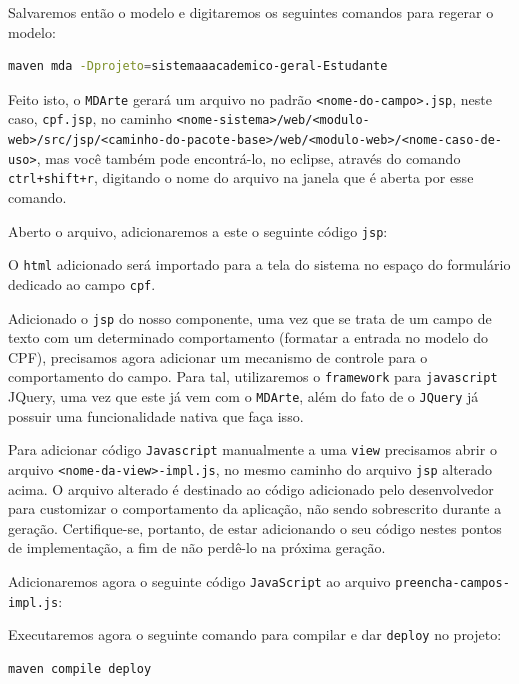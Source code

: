 Salvaremos então o modelo e digitaremos os seguintes comandos para regerar o
modelo:

\begin{lstlisting}[language=bash, frame=single, breaklines=true]
maven mda -Dprojeto=sistemaaacademico-geral-Estudante
\end{lstlisting}

Feito isto, o \texttt{MDArte} gerará um arquivo no padrão
\texttt{<nome-do-campo>.jsp}, neste caso, \texttt{cpf.jsp}, no caminho
\texttt{<nome-sistema>/web/<modulo-web>/src/jsp/<caminho-do-pacote-base>/web/<modulo-web>/<nome-caso-de-uso>},
mas você também pode encontrá-lo, no eclipse, através do comando
\texttt{ctrl+shift+r}, digitando o nome do arquivo na janela que é aberta por
esse comando.

Aberto o arquivo, adicionaremos a este o seguinte código \texttt{jsp}:



O \texttt{html} adicionado será importado para a tela do sistema no espaço do
formulário dedicado ao campo \texttt{cpf}.

Adicionado o \texttt{jsp} do nosso componente, uma vez que se trata de um campo
de texto com um determinado comportamento (formatar a entrada no modelo do CPF),
precisamos agora adicionar um mecanismo de controle para o comportamento do
campo. Para tal, utilizaremos o \texttt{framework} para \texttt{javascript}
JQuery, uma vez que este já vem com o \texttt{MDArte}, além do fato de o
\texttt{JQuery} já possuir uma funcionalidade nativa que faça isso.

Para adicionar código \texttt{Javascript} manualmente a uma \texttt{view}
precisamos abrir o arquivo \texttt{<nome-da-view>-impl.js}, no mesmo caminho
do arquivo \texttt{jsp} alterado acima. O arquivo alterado é destinado ao código
adicionado pelo desenvolvedor para customizar o comportamento da aplicação, não
sendo sobrescrito durante a geração. Certifique-se, portanto, de estar
adicionando o seu código nestes pontos de implementação, a fim de não perdê-lo
na próxima geração.

Adicionaremos agora o seguinte código \texttt{JavaScript} ao arquivo
\texttt{preencha-campos-impl.js}:



Executaremos agora o seguinte comando para compilar e dar \texttt{deploy} no
projeto:
\begin{lstlisting}[language=bash, frame=single, breaklines=true]
maven compile deploy
\end{lstlisting}

